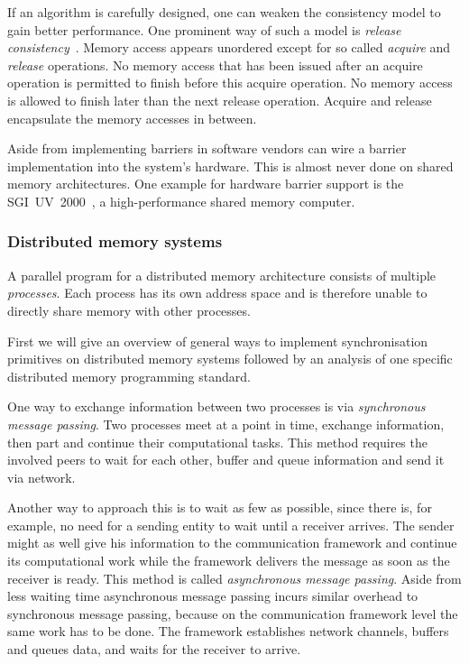 \documentclass[a4paper, 10pt]{article}
\begin{document}
If an algorithm is carefully designed, one can weaken the consistency model to gain better performance. One prominent way of such a model is \textit{release consistency}~\cite{gha90}. Memory access appears unordered except for so called \emph{acquire} and \emph{release} operations. No memory access that has been issued after an acquire operation is permitted to finish before this acquire operation. No memory access is allowed to finish later than the next release operation. Acquire and release encapsulate the memory accesses in between.

Aside from implementing barriers in software vendors can wire a barrier implementation into the system's hardware. This is almost never done on shared memory architectures. One example for hardware barrier support is the SGI~UV~2000~\cite{sgiuv2000}, a high-performance shared memory computer.

\subsubsection{Distributed memory systems}
\label{sssec:background-means-distributed}
A parallel program for a distributed memory architecture consists of multiple \emph{processes}. Each process has its own address space and is therefore unable to directly share memory with other processes.

First we will give an overview of general ways to implement synchronisation primitives on distributed memory systems followed by an analysis of one specific distributed memory programming standard.

One way to exchange information between two processes is via \emph{synchronous message passing}. Two processes meet at a point in time, exchange information, then part and continue their computational tasks. This method requires the involved peers to wait for each other, buffer and queue information and send it via network.

Another way to approach this is to wait as few as possible, since there is, for example, no need for a sending entity to wait until a receiver arrives. The sender might as well give his information to the communication framework and continue its computational work while the framework delivers the message as soon as the receiver is ready. This method is called \emph{asynchronous message passing}. Aside from less waiting time asynchronous message passing incurs similar overhead to synchronous message passing, because on the communication framework level the same work has to be done. The framework establishes network channels, buffers and queues data, and waits for the receiver to arrive.
\end{document}
